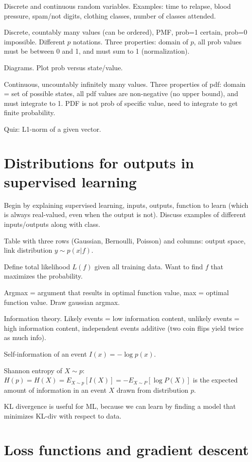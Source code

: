 \documentclass{article}
\begin{document}
Discrete and continuous random variables. Examples: time to relapse,
blood pressure, spam/not digits, clothing classes, number of classes
attended.

Discrete, countably many values (can be ordered), PMF, prob=1 certain,
prob=0 impossible. Different $p$ notations. Three properties: domain
of $p$, all prob values must be between 0 and 1, and must sum to 1
(normalization).

Diagrams. Plot prob versus state/value.

Continuous, uncountably infinitely many values. Three properties of pdf:
domain = set of possible states, all pdf values are non-negative (no
upper bound), and must integrate to 1. PDF is not prob of specific
value, need to integrate to get finite probability.

Quiz: L1-norm of a given vector.

\section{Distributions for outputs in supervised learning}

Begin by explaining supervised learning, inputs, outputs, function to
learn (which is always real-valued, even when the output is
not). Discuss examples of different inputs/outputs along with class.

Table with three rows (Gaussian, Bernoulli, Poisson) and columns:
output space, link distribution $y\sim p(x|f)$.

Define total likelihood $L(f)$ given all training data. Want to find
$f$ that maximizes the probability.

Argmax = argument that results in optimal function value, max =
optimal function value. Draw gaussian argmax.

Information theory. Likely events = low information content, unlikely
events = high information content, independent events additive (two
coin flips yield twice as much info).

Self-information of an event $I(x) = -\log p(x)$.

Shannon entropy of $X\sim p$: $H(p)=H(X)= E_{X\sim p}[I(X)] =
-E_{X\sim P} [ \log P(X) ]$ is the expected amount of information in
an event $X$ drawn from distribution $p$.

KL divergence is useful for ML, because we can learn by finding a
model that minimizes KL-div with respect to data.

\section{Loss functions and gradient descent}
\end{document}
